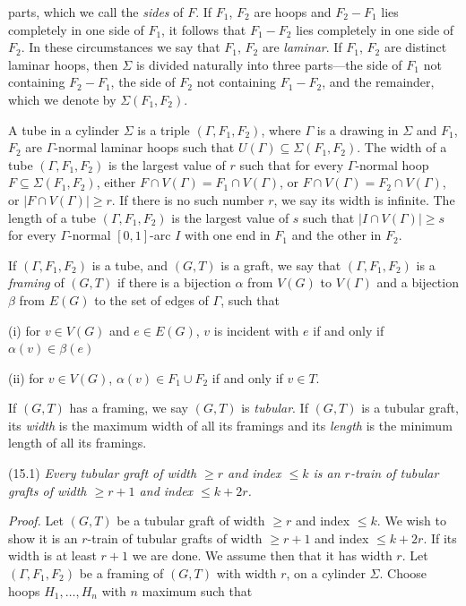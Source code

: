 \noindent parts, which we call the \textit{sides} of $F$. If $F_1$, $F_2$ are hoops and $F_2 - F_1$ lies completely in one side of $F_1$, it follows that $F_1 - F_2$ lies completely in one side of $F_2$. In these circumstances we say that $F_1$, $F_2$ are \textit{laminar}. If $F_1$, $F_2$ are distinct laminar hoops, then $\Sigma$ is divided naturally into three parts---the side of $F_1$ not containing $F_2 - F_1$, the side of $F_2$ not containing $F_1 - F_2$, and the remainder, which we denote by $\Sigma(F_1, F_2)$.

A tube in a cylinder $\Sigma$ is a triple $(\Gamma, F_1, F_2)$, where $\Gamma$ is a drawing in $\Sigma$ and $F_1$, $F_2$ are $\Gamma$-normal laminar hoops such that $U(\Gamma) \subseteq \Sigma(F_1, F_2)$. The width of a tube $(\Gamma, F_1, F_2)$ is the largest value of $r$ such that for every $\Gamma$-normal hoop $F \subseteq \Sigma(F_1, F_2)$, either $F \cap V(\Gamma) = F_1 \cap V(\Gamma)$, or $F \cap V(\Gamma) = F_2 \cap V(\Gamma)$, or $|F \cap V(\Gamma)| \ge r$. If there is no such number $r$, we say its width is infinite. The length of a tube $(\Gamma, F_1, F_2)$ is the largest value of $s$ such that $|I \cap V(\Gamma)| \ge s$ for every $\Gamma$-normal $[0, 1]$-arc $I$ with one end in $F_1$ and the other in $F_2$.

If $(\Gamma, F_1, F_2)$ is a tube, and $(G, T)$ is a graft, we say that $(\Gamma, F_1, F_2)$ is a \textit{framing} of $(G, T)$ if there is a bijection $\alpha$ from $V(G)$ to $V(\Gamma)$ and a bijection $\beta$ from $E(G)$ to the set of edges of $\Gamma$, such that

\hspace*{12pt}(i) for $v \in V(G)$ and $e \in E(G)$, $v$ is incident with $e$ if and only if $\alpha(v) \in \beta(e)$

\hspace*{12pt}(ii) for $v \in V(G)$, $\alpha(v) \in F_1 \cup F_2$ if and only if $v \in T$.

If $(G, T)$ has a framing, we say $(G, T)$ is \textit{tubular}. If $(G, T)$ is a tubular graft, its \textit{width} is the maximum width of all its framings and its \textit{length} is the minimum length of all its framings.

\stmt
(15.1) \textit{Every tubular graft of width $\ge r$ and index $\le k$ is an $r$-train of tubular grafts of width $\ge r + 1$ and index $\le k + 2r$.}

\textit{Proof.} Let $(G, T)$ be a tubular graft of width $\ge r$ and index $\le k$. We wish to show it is an $r$-train of tubular grafts of width $\ge r + 1$ and index $\le k + 2r$. If its width is at least $r + 1$ we are done. We assume then that it has width $r$. Let $(\Gamma, F_1, F_2)$ be a framing of $(G, T)$ with width $r$, on a cylinder $\Sigma$. Choose hoops $H_1, \dots, H_n$ with $n$ maximum such that

